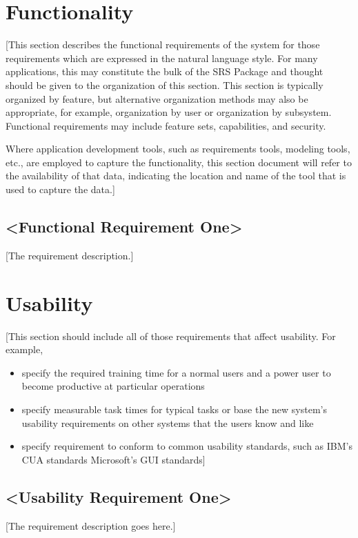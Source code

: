 \documentclass[a4paper,12pt,chapterprefix=false,bibliography=totoc,listof=totoc]{scrreprt}
\begin{document}
\section{Functionality}
[This section describes the functional requirements of the system for those requirements which are expressed in the natural language style. For many applications, this may constitute the bulk of the SRS Package and thought should be given to the organization of this section. This section is typically organized by feature, but alternative organization methods may also be appropriate, for example, organization by user or organization by subsystem.  Functional requirements may include feature sets, capabilities, and security.

Where application development tools, such as requirements tools, modeling tools, etc., are employed to capture the functionality, this section document will refer to the availability of that data, indicating the location and name of the tool that is used to capture the data.]

\subsection{<Functional Requirement One>}
[The requirement description.]

\section{Usability}
[This section should include all of those requirements that affect usability. For example,
\begin{itemize}
	\item specify the required training time for a normal users and a power user to become productive at particular operations
	\item specify measurable task times for typical tasks or base the new system’s usability requirements on other systems that the users know and like
	\item specify requirement to conform to common usability standards, such as IBM’s CUA standards Microsoft’s GUI standards]
\end{itemize}

\subsection{<Usability Requirement One>}
[The requirement description goes here.]
\end{document}
